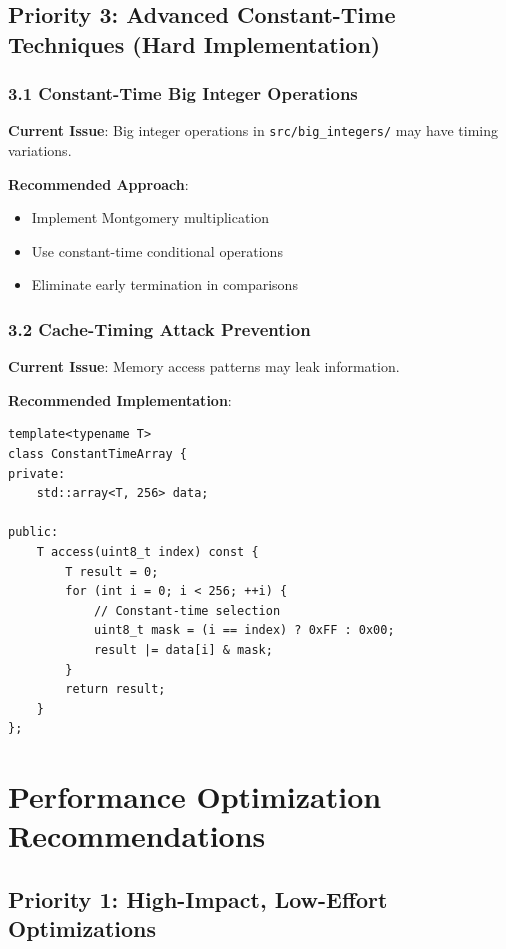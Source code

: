 \documentclass[11pt,a4paper]{article}
\begin{document}
\subsection{Priority 3: Advanced Constant-Time Techniques (Hard Implementation)}

\subsubsection{3.1 Constant-Time Big Integer Operations}

\textbf{Current Issue}: Big integer operations in \texttt{src/big\_integers/} may have timing variations.

\textbf{Recommended Approach}:
\begin{itemize}
    \item Implement Montgomery multiplication
    \item Use constant-time conditional operations
    \item Eliminate early termination in comparisons
\end{itemize}

\subsubsection{3.2 Cache-Timing Attack Prevention}

\textbf{Current Issue}: Memory access patterns may leak information.

\textbf{Recommended Implementation}:
\begin{lstlisting}
template<typename T>
class ConstantTimeArray {
private:
    std::array<T, 256> data;
    
public:
    T access(uint8_t index) const {
        T result = 0;
        for (int i = 0; i < 256; ++i) {
            // Constant-time selection
            uint8_t mask = (i == index) ? 0xFF : 0x00;
            result |= data[i] & mask;
        }
        return result;
    }
};
\end{lstlisting}

\section{Performance Optimization Recommendations}

\subsection{Priority 1: High-Impact, Low-Effort Optimizations}
\end{document}
